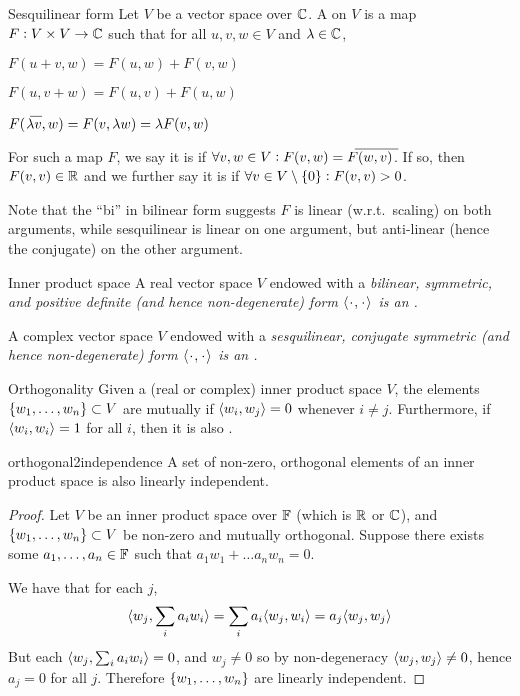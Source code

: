 \documentclass{styles/tufte}
\begin{document}
\begin{definition}{Sesquilinear form}{}
  Let $V$ be a vector space over $\mathbb{C}$. A  on $V$ is a map $F: V \times V \to \mathbb{C}$ such that for all $u, v, w \in V$ and $\lambda \in \mathbb{C}$,
  \begin{romanenum}
    \item $F(u + v, w) = F(u, w) + F(v, w)$
    \item $F(u, v + w) = F(u, v) + F(u, w)$
    \item $F(\hspace{-0.2em}\conj{\hphantom{.}\lambda} v, w) = F(v, \lambda w) = \lambda F(v, w)$
  \end{romanenum}
  For such a map $F$, we say it is  if $\forall v, w \in V: F(v, w) = \conj{F(w, v)}$. If so, then $F(v, v) \in \mathbb{R}$ and we further say it is  if $\forall v \in V \setminus \set{0}: F(v, v) > 0$.
\end{definition}

Note that the ``bi'' in bilinear form suggests $F$ is linear (w.r.t.~scaling) on both arguments, while sesquilinear is linear on one argument, but anti-linear (hence the conjugate) on the other argument.

\begin{definition}{Inner product space}{}
  A real vector space $V$ endowed with a \em{bilinear}, \em{symmetric}, and \em{positive definite} (and hence non-degenerate) form $\abrak{\funcarg, \funcarg}$ is an .
  
  A complex vector space $V$ endowed with a \em{sesquilinear}, \em{conjugate symmetric} (and hence non-degenerate) form $\abrak{\funcarg, \funcarg}$ is an .
\end{definition}

\begin{definition}{Orthogonality}{}
  Given a (real or complex) inner product space $V$, the elements $\set{w_1, \dots, w_n} \subset V$ are mutually  if $\langle w_i, w_j \rangle = 0$ whenever $i \neq j$. Furthermore, if $\langle w_i, w_i \rangle = 1$ for all $i$, then it is also .
\end{definition}

\begin{proposition}{}{orthogonal2independence}
  A set of non-zero, orthogonal elements of an inner product space is also linearly independent.
\end{proposition}
\begin{proof}
  Let $V$ be an inner product space over $\mathbb{F}$ (which is $\mathbb{R}$ or $\mathbb{C}$), and $\set{w_1, \dots, w_n} \subset V$ be non-zero and mutually orthogonal. Suppose there exists some $a_1, \dots, a_n \in \mathbb{F}$ such that $a_1 w_1 + \dots a_n w_n = 0$.
  
  We have that for each $j$,
  \[ \langle w_j, \sum_i a_i w_i \rangle = \sum_i a_i \langle w_j, w_i \rangle = a_j \langle w_j, w_j \rangle \]
  But each $\langle w_j, \sum_i a_i w_i \rangle = 0$, and $w_j \neq 0$ so by non-degeneracy $\langle w_j, w_j \rangle \neq 0$, hence $a_j = 0$ for all $j$. Therefore $\set{w_1, \dots, w_n}$ are linearly independent.
\end{proof}
\end{document}
